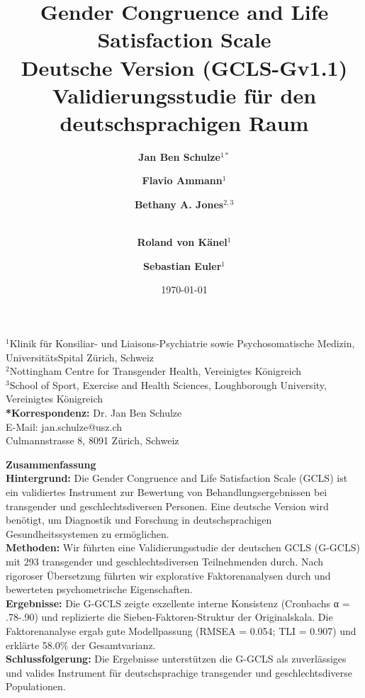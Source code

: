 \documentclass[11pt,a4paper]{article}
\title{
    \vspace{-2cm}
    {\Huge\bfseries\color{darkblue} Gender Congruence and Life Satisfaction Scale}\\[0.5cm]
    {\Large\bfseries Deutsche Version (GCLS-Gv1.1)}\\[1cm]
    {\large Validierungsstudie für den deutschsprachigen Raum}
}
\author{
    \large 
    \textbf{Jan Ben Schulze}$^{1*}$ \and
    \textbf{Flavio Ammann}$^{1}$ \and 
    \textbf{Bethany A. Jones}$^{2,3}$ \and\\
    \textbf{Roland von Känel}$^{1}$ \and
    \textbf{Sebastian Euler}$^{1}$
}
\date{\today}
\begin{document}
\maketitle

\begin{center}
\vspace{1cm}
\begin{tcolorbox}[colback=lightgray,colframe=darkblue,width=0.8\textwidth,arc=3mm]
\centering
\footnotesize
$^{1}$Klinik für Konsiliar- und Liaisons-Psychiatrie sowie Psychosomatische Medizin,\\
UniversitätsSpital Zürich, Schweiz\\[0.3cm]
$^{2}$Nottingham Centre for Transgender Health, Vereinigtes Königreich\\[0.1cm]
$^{3}$School of Sport, Exercise and Health Sciences, Loughborough University,\\
Vereinigtes Königreich\\[0.5cm]
\textbf{*Korrespondenz:} Dr. Jan Ben Schulze\\
E-Mail: jan.schulze@usz.ch\\
Culmannstrasse 8, 8091 Zürich, Schweiz
\end{tcolorbox}
\end{center}

\vfill

\begin{center}
\begin{tcolorbox}[colback=darkblue!10,colframe=darkblue,width=0.9\textwidth,arc=3mm]
\centering
\textbf{\large Zusammenfassung}\\[0.5cm]
\small
\textbf{Hintergrund:} Die Gender Congruence and Life Satisfaction Scale (GCLS) ist ein validiertes Instrument zur Bewertung von Behandlungsergebnissen bei transgender und geschlechtsdiversen Personen. Eine deutsche Version wird benötigt, um Diagnostik und Forschung in deutschsprachigen Gesundheitssystemen zu ermöglichen.\\[0.3cm]

\textbf{Methoden:} Wir führten eine Validierungsstudie der deutschen GCLS (G-GCLS) mit 293 transgender und geschlechtsdiversen Teilnehmenden durch. Nach rigoroser Übersetzung führten wir explorative Faktorenanalysen durch und bewerteten psychometrische Eigenschaften.\\[0.3cm]

\textbf{Ergebnisse:} Die G-GCLS zeigte exzellente interne Konsistenz (Cronbachs α = .78-.90) und replizierte die Sieben-Faktoren-Struktur der Originalskala. Die Faktorenanalyse ergab gute Modellpassung (RMSEA = 0.054; TLI = 0.907) und erklärte 58.0\% der Gesamtvarianz.\\[0.3cm]

\textbf{Schlussfolgerung:} Die Ergebnisse unterstützen die G-GCLS als zuverlässiges und valides Instrument für deutschsprachige transgender und geschlechtsdiverse Populationen.
\end{tcolorbox}
\end{center}
\end{document}
